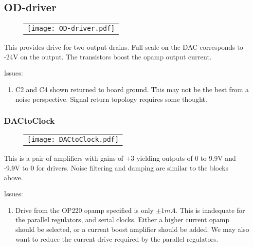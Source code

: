 \documentclass[a4paper,12pt]{article}
\begin{document}
\subsection{OD-driver}
   \begin{figure}
   \begin{center}
   \begin{tabular}{c}
   \texttt{[image: OD-driver.pdf]}
   \end{tabular}
   \end{center}
   \end{figure}

This provides drive for two output drains. Full scale on the DAC corresponds to -24V on the output. The transistors boost the opamp output current.


Issues:
\begin{enumerate}
\item
C2 and C4 shown returned to board ground. This may not be the best from a noise perspective. Signal return topology requires some thought.
\end{enumerate}

\subsubsection{DACtoClock}

   \begin{figure}
   \begin{center}
   \begin{tabular}{c}
   \texttt{[image: DACtoClock.pdf]}
   \end{tabular}
   \end{center}
   \end{figure}


This is a pair of amplifiers with gains of $\pm3$ yielding outputs of 0 to 9.9V and -9.9V to 0 for drivers. Noise filtering and damping are similar to the blocks above.

Issues:
\begin{enumerate}
\item
Drive from the OP220 opamp specified is only $\pm1 mA$. This is inadequate for the parallel regulators, and serial clocks. Either a higher current opamp should be selected, or a current boost amplifier should be added. We may also want to reduce the current drive required by the parallel regulators.
\end{enumerate}
\end{document}
